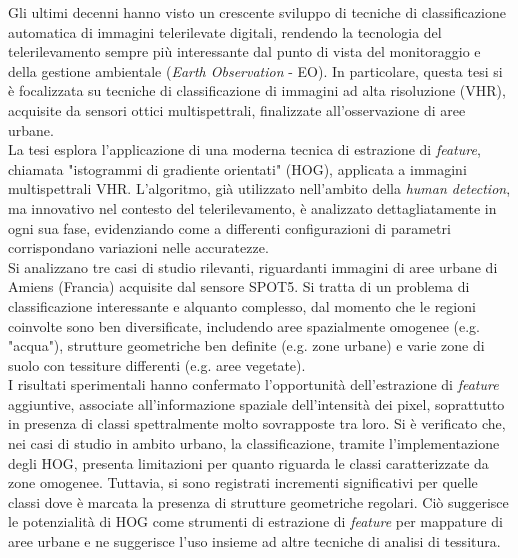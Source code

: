 
\italiano
\sommario
{}

Gli ultimi decenni hanno visto un crescente sviluppo di tecniche di classificazione automatica di immagini telerilevate digitali, rendendo la tecnologia del telerilevamento sempre più interessante dal punto di vista del monitoraggio e della gestione ambientale (\emph{Earth Observation} - EO).
In particolare, questa tesi si è focalizzata su tecniche di classificazione di immagini ad alta risoluzione (VHR), acquisite da sensori ottici multispettrali, finalizzate all'osservazione di aree urbane. 
\\
La tesi esplora l'applicazione di una moderna tecnica di estrazione di \emph{feature}, chiamata "istogrammi di gradiente orientati" (HOG), applicata a immagini multispettrali VHR.   
L'algoritmo, già utilizzato nell'ambito della \emph{human detection}, ma innovativo nel contesto del telerilevamento, è analizzato dettagliatamente in ogni sua fase, evidenziando come a differenti configurazioni di parametri corrispondano variazioni nelle accuratezze. 
\\
Si analizzano tre casi di studio rilevanti, riguardanti immagini di aree urbane di Amiens (Francia) acquisite dal sensore SPOT5. Si tratta di un problema di classificazione interessante e alquanto complesso, dal momento che le regioni coinvolte sono ben diversificate, includendo aree spazialmente omogenee (e.g. "acqua"), strutture geometriche ben definite (e.g. zone urbane) e varie zone di suolo con tessiture differenti (e.g. aree vegetate).
\\
I risultati sperimentali hanno confermato l'opportunità dell'estrazione di \emph{feature} aggiuntive, associate all'informazione spaziale dell'intensità dei pixel, soprattutto in presenza di classi spettralmente molto sovrapposte tra loro. Si è verificato che, nei casi di studio in ambito urbano, la classificazione, tramite l'implementazione degli HOG, presenta limitazioni per quanto riguarda le classi caratterizzate da zone omogenee. Tuttavia, si sono registrati incrementi significativi per quelle classi dove è marcata la presenza di strutture geometriche regolari.
Ciò suggerisce le potenzialità di HOG come strumenti di estrazione di \emph{feature} per mappature di aree urbane e ne suggerisce l'uso insieme ad altre tecniche di analisi di tessitura.



